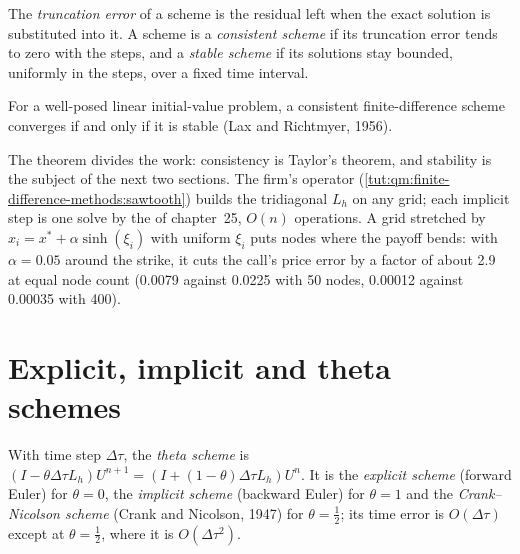 \begin{definition}\label{def:qm:finite-difference-methods:consistent}
The \emph{truncation error} of a scheme is the residual left when the exact solution is substituted into it. A scheme is a \emph{consistent scheme} if its
truncation error tends to zero with the steps, and a \emph{stable scheme} if its solutions stay bounded, uniformly in the steps, over a fixed time interval.
\end{definition}

\begin{theorem}\label{thm:qm:finite-difference-methods:lax}
For a well-posed linear initial-value problem, a consistent finite-difference scheme converges if and only if it is stable (Lax and Richtmyer, 1956).
\end{theorem}

The theorem divides the work: consistency is Taylor's theorem, and stability is the subject of the next two sections. The firm's operator (\cref{tut:qm:finite-difference-methods:sawtooth}) builds the
tridiagonal $L_h$ on any grid; each implicit step is one solve by the  of chapter~25, $O(n)$ operations. A grid stretched by $x_i = x^* + \alpha\sinh(\xi_i)$ with
uniform $\xi_i$ puts nodes where the payoff bends: with $\alpha = 0.05$ around the strike, it cuts the call's price error by a factor of about 2.9 at equal node count (0.0079 against 0.0225 with 50
nodes, 0.00012 against 0.00035 with 400).

\section{Explicit, implicit and theta schemes}

\begin{definition}\label{def:qm:finite-difference-methods:theta}
With time step $\Delta\tau$, the \emph{theta scheme} is $(I - \theta\Delta\tau L_h)U^{n+1} = (I + (1 - \theta)\Delta\tau L_h)U^n$. It is the \emph{explicit scheme}
(forward Euler) for $\theta = 0$, the \emph{implicit scheme} (backward Euler) for $\theta = 1$ and the \emph{Crank--Nicolson scheme} (Crank and Nicolson,
1947) for $\theta = \frac12$; its time error is $O(\Delta\tau)$ except at $\theta = \frac12$, where it is $O(\Delta\tau^2)$.
\end{definition}

